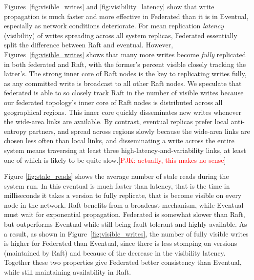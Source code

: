 \documentclass[10pt,conference,letterpaper]{IEEEtran}
\newcommand{\todo}[1]{{\textcolor{red}{#1}}}
\newcommand{\pjk}[1]{[\todo{PJK: #1}]}
\begin{document}

Figures~\ref{fig:visible_writes} and \ref{fig:visibility_latency} show that write
propagation is much faster and more effective in Federated than it is in Eventual,
especially as network conditions deteriorate.
For mean replication \emph{latency} (visibility) of writes spreading across all system
replicas, Federated essentially split the difference between Raft and eventual.
However, Figures~\ref{fig:visible_writes} shows that many more writes become \emph{fully}
replicated in both federated and Raft, with the former's percent visible closely tracking
the latter's.
The strong inner core of Raft nodes is the key to replicating writes fully, as any
committed write is broadcast to all other Raft nodes.
We speculate that federated is able to so closely track Raft in the number of visible
writes because our federated topology's inner core of Raft nodes is distributed across all
geographical regions.
This inner core quickly disseminates new writes whenever the wide-area links are
available.
By contrast, eventual replicas prefer local anti-entropy partners, and spread across
regions slowly because the wide-area links are chosen less often than local links, and
disseminating a write across the entire system means traversing at least three
high-latency-and-variability links, at least one of which is likely to be quite
slow.\pjk{actually, this makes no sense}

Figure \ref{fig:stale_reads} shows the average number of stale reads during the system
run. In this eventual is much faster than 
latency, that is the time in milliseconds it takes a version to fully
replicate, that is become visible on every node in the network.
Raft benefits from a broadcast mechanism, while Eventual must wait for
exponential propagation.
Federated is somewhat slower than Raft, but outperforms Eventual while
still being fault tolerant and highly available.
As a result, as shown in Figure~\ref{fig:visible_writes}, the number
of fully visible writes is higher for Federated than Eventual, since
there is less stomping on versions (maintained by Raft) and because of
the decrease in the visibility latency.
Together these two properties give Federated better consistency than
Eventual, while still maintaining availability in Raft.
\end{document}
